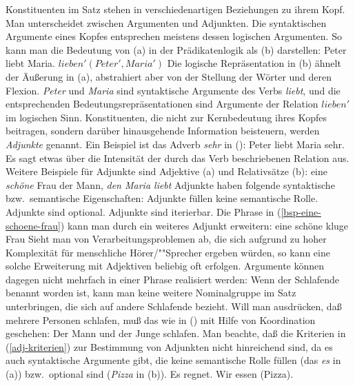 Konstituenten im Satz stehen in verschiedenartigen Beziehungen zu ihrem Kopf.
Man unterscheidet zwischen Argumenten und Adjunkten. Die syntaktischen Argumente
eines Kopfes entsprechen meistens dessen logischen Argumenten. So kann man
die Bedeutung von (a) in der Prädikatenlogik als (b) darstellen:
\eal
\ex Peter liebt Maria.
\ex $lieben'(Peter', Maria')$
\zl
Die logische Repräsentation in (b) ähnelt der Äußerung in (a),
abstrahiert aber von der Stellung der Wörter und deren Flexion.
\emph{Peter} und \emph{Maria} sind syntaktische Argumente des Verbs \emph{liebt},
und die entsprechenden Bedeutungsrepräsentationen sind Argumente der Relation $lieben'$
im logischen Sinn. 
Konstituenten, die nicht zur Kernbedeutung ihres Kopfes beitragen,
sondern darüber hinausgehende Information beisteuern, werden \emph{Adjunkte}
genannt. Ein Beispiel ist das Adverb \emph{sehr} in ():
\ea
Peter liebt Maria sehr.
\z
Es sagt etwas über die Intensität der durch das Verb beschriebenen Relation aus.
Weitere Beispiele für Adjunkte sind Adjektive (a) und Relativsätze (b):
\eal
\ex\label{bsp-eine-schoene-frau}
eine \emph{schöne} Frau
\ex der Mann, \emph{den Maria liebt}
\zl
Adjunkte haben folgende syntaktische bzw.\ semantische Eigenschaften:
\eal
\label{adj-kriterien}
\ex Adjunkte füllen keine semantische Rolle.
\ex Adjunkte sind optional.
\ex Adjunkte sind iterierbar.
\zl
Die Phrase in (\ref{bsp-eine-schoene-frau}) kann man durch ein weiteres Adjunkt erweitern:
\ea
eine schöne kluge Frau
\z
Sieht man von Verarbeitungsproblemen ab, die sich aufgrund zu hoher Komplexität
für menschliche Hörer/""Sprecher ergeben würden, so kann eine solche Erweiterung
mit Adjektiven beliebig oft erfolgen. Argumente können dagegen nicht mehrfach 
in einer Phrase realisiert werden:
\z
Wenn der Schlafende benannt worden ist, kann man keine weitere Nominalgruppe
im Satz unterbringen, die sich auf andere Schlafende bezieht. Will man ausdrücken,
daß mehrere Personen schlafen, muß das wie in () mit Hilfe von
Koordination geschehen:
\ea
Der Mann und der Junge schlafen.
\z
Man beachte, daß die Kriterien in (\ref{adj-kriterien}) zur Bestimmung von Adjunkten
nicht hinreichend sind, da es auch syntaktische
Argumente gibt, die keine semantische Rolle füllen (das \emph{es} in (a)) bzw.\ optional
sind (\emph{Pizza} in (b)).
\eal
\ex Es regnet.
\ex Wir essen (Pizza).
\zl

